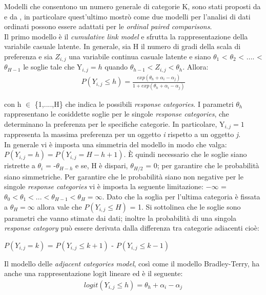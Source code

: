 Modelli che consentono un numero generale di categorie K, sono stati proposti da \autocite{tutz1986bradley} e da \autocite{bradley1952rank}, in particolare quest'ultimo mostrò come due modelli per l'analisi di dati ordinati possono essere adattati per le \emph{ordinal paired comparisons}.\\

Il primo modello è il \emph{cumulative link model} e sfrutta la rappresentazione della variabile casuale latente. In generale, sia H il numero di gradi della scala di preferenza e sia $Z_{i,j}$ una variabile continua casuale latente e siano $\theta_{1} $ < $\theta_{2}$ < .... < $\theta_{H-1}$ le soglie tale che Y$_{i,j} = h$ quando $\theta_{h-1} < Z_{i,j} < \theta_{h}$. Allora:
\begin{align}
	P(Y_{i,j}\leq h) =  \frac{exp(\theta_{h} + \alpha_{i} - \alpha_{j})}{1 + exp(\theta_{h} + \alpha_{i} - \alpha_{j})} \label{for:3.2.1}
\end{align}

con h $\in$ \{1,....,H\} che indica le possibili \emph{response categories}. I parametri $\theta_{h}$ rappresentano le cosiddette soglie per le singole \emph{response categories}, che determinano la preferenza per le specifiche categorie. In particolare, Y$_{i,j} = 1$ rappresenta la massima preferenza per un oggetto \textit{i} rispetto a un oggetto \textit{j}.\\
In generale vi è imposta una simmetria del modello in modo che valga: $P(Y_{i,j} = h) = P(Y_{i,j} = H - h + 1)$. È quindi necessario che le soglie siano ristrette a $\theta_{i}$ = -$\theta_{H-h}$ e se, H è dispari, $\theta_{H/2}$ = 0; per garantire che le probabilità siano simmetriche. Per garantire che le probabilità siano non negative per le singole \emph{response categories} vi è imposta la seguente limitazione: $-\infty$ = $\theta_{0} < \theta_{1} < ... < \theta_{H-1} < \theta_{H} = \infty$. Dato che la soglia per l'ultima categoria è fissata a $\theta_{H} = \infty$ allora vale che $P(Y_{i,j} \leq H)$ = 1. Si sottolinea che le soglie sono parametri che vanno stimate dai dati; inoltre la probabilità di una singola \emph{response category} può essere derivata dalla differenza tra categorie adiacenti cioè:
\begin{center}
	  $P(Y_{i,j} = k)$ = $P(Y_{i,j} \leq k + 1)$ - $P(Y_{i,j} \leq k - 1)$
\end{center}

Il modello delle \emph{adjacent categories model}, così come il modello Bradley-Terry, ha anche una rappresentazione logit lineare ed è il seguente:
\begin{align}
	logit(Y_{i,j}\leq h) =  \theta_{h} + \alpha_i - \alpha_j 
\end{align}

